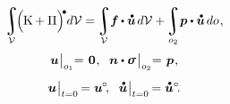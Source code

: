\nopagebreak
\hspace*{-\parindent}\begin{minipage}{\linewidth}
\begin{equation}\label{dynamicsoflineartheory:integralofenergy}
\displaystyle\integral\displaylimits_{\mathcal{V}}
\hspace{-0.4ex} \Bigl( \hspace{-0.1ex} \kineticenergydensity + \potentialenergydensity \Bigr)^{\hspace{-0.33ex}\tikz[baseline=-0.2ex] \draw[black, fill=black] (0,0) circle (.28ex);} d\mathcal{V}
= \hspace{-0.2ex}
\displaystyle\integral\displaylimits_{\mathcal{V}} \hspace{-0.5ex} \bm{f} \hspace{-0.1ex} \dotp \mathdotabove{\bm{u}} \hspace{.3ex} d\mathcal{V}
+ \hspace{-0.2ex}
\displaystyle\integral\displaylimits_{o_2} \hspace{-0.4ex} \bm{p} \dotp \mathdotabove{\bm{u}} \hspace{.3ex} do
\hspace{.15ex} ,
\end{equation}
%
\nopagebreak\vspace{-0.25em}\begin{gather*}
\bm{u} \hspace{.1ex} \bigr|_{o_1} \hspace{-0.64ex} = \hspace{.2ex} \bm{0}
\hspace{.1ex} ,
\hspace{.6em}
%
\unitnormalvector \dotp \linearstress \hspace{.2ex} \bigr|_{o_2} \hspace{-0.64ex} = \hspace{.2ex} \bm{p}
\hspace{.15ex} ,
%
\\[.5em]
%
\bm{u} \hspace{.1ex} \bigr|_{t=0} \hspace{-0.2ex} = \bm{u}^{\hspace{-0.1ex}\circ}
\hspace{-0.4ex} ,
\hspace{.6em}
%
\mathdotabove{\bm{u}} \hspace{.1ex} \bigr|_{t=0} \hspace{-0.2ex} = \mathdotabove{\bm{u}}^{\circ}
\hspace{-0.4ex} .
\end{gather*}
\end{minipage}


